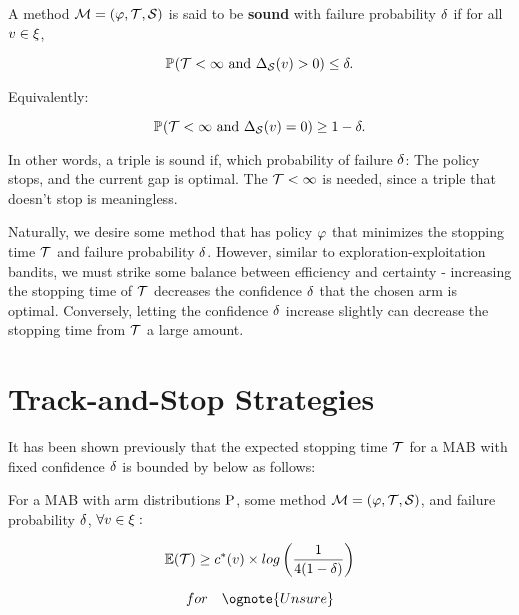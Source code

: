 
\begin{definition}\label{def:soundess}
A method  $\mathcal{M} = (\varphi, \mathcal{T}, \mathcal{S})$ is said to be \textbf{sound} with failure probability $\delta$ if for all  $v \in \xi$,

$$\mathbb{P}_{}(\mathcal{T} < \infty  \text{ and }  \Delta_{\mathcal{S}}(v) > 0) \leq \delta.$$

Equivalently:

$$\mathbb{P}_{}(\mathcal{T} < \infty  \text{ and }  \Delta_{\mathcal{S}}(v) = 0) \geq 1-\delta.$$

\end{definition}

In other words, a triple is sound if, which probability of failure $\delta$: The policy stops, and the current gap is optimal. The $\mathcal{T} < \infty$ is needed, since a triple that doesn't stop is meaningless.

Naturally, we desire some method that has policy $\varphi$ that minimizes the stopping time $\mathcal{T}$ and failure probability $\delta$. However, similar to exploration-exploitation bandits, we must strike some balance between efficiency and certainty - increasing the stopping time of $\mathcal{T}$ decreases the confidence $\delta$ that the chosen arm is optimal. Conversely, letting the confidence $\delta$ increase slightly can decrease the stopping time from $\mathcal{T}$ a large amount.


\section{Track-and-Stop Strategies}
\label{sec:trackandstop}
It has been shown previously that the expected stopping time $\mathcal{T}$ for a MAB with fixed confidence $\delta$ is bounded by below as follows:

\begin{theorem}
For a MAB with arm distributions $\mathrm{P}$, some method $\mathcal{M} = (\varphi, \mathcal{T}, \mathcal{S})$, and failure probability $\delta$, $\forall v \in \xi:$ 

$$\mathbb{E}(\mathcal{T}) \geq c^*(v) \times log\left({\frac{1}{4(1-\delta)}}\right)$$

$$for \quad \ognote{Unsure}$$
\end{theorem}

